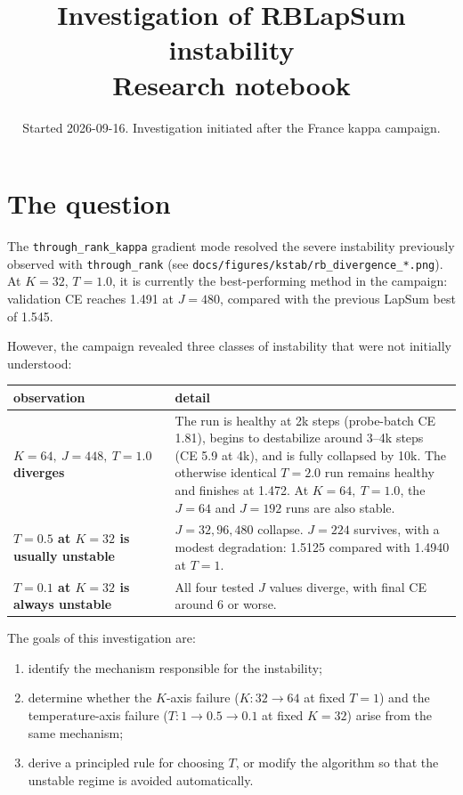 \documentclass[11pt,a4paper]{article}
\title{
Investigation of RBLapSum \code{through\_rank\_kappa} instability\\[2pt]
\large Research notebook
}
\author{}
\date{Started 2026-09-16. Investigation initiated after the France kappa campaign.}
\newcommand{\code}[1]{\texttt{#1}}
\begin{document}
\maketitle
\vspace{-2em}
\tableofcontents


\section{The question}

The \code{through\_rank\_kappa} gradient mode resolved the severe instability
previously observed with \code{through\_rank}
(see \code{docs/figures/kstab/rb\_divergence\_*.png}).
At \(K=32\), \(T=1.0\), it is currently the best-performing method in the
campaign: validation CE reaches 1.491 at \(J=480\), compared with the previous
LapSum best of 1.545.

However, the campaign revealed three classes of instability that were not
initially understood:

\begin{center}\small
\begin{tabular}{p{4.2cm}p{9.6cm}}
\toprule
observation & detail \\
\midrule

\textbf{\(K=64,\ J=448,\ T=1.0\) diverges}
&
The run is healthy at 2k steps (probe-batch CE 1.81), begins to destabilize
around 3--4k steps (CE 5.9 at 4k), and is fully collapsed by 10k.
The otherwise identical \(T=2.0\) run remains healthy and finishes at 1.472.
At \(K=64,\ T=1.0\), the \(J=64\) and \(J=192\) runs are also stable.
\\[2pt]

\textbf{\(T=0.5\) at \(K=32\) is usually unstable}
&
\(J=32,96,480\) collapse. \(J=224\) survives, with a modest degradation:
1.5125 compared with 1.4940 at \(T=1\).
\\[2pt]

\textbf{\(T=0.1\) at \(K=32\) is always unstable}
&
All four tested \(J\) values diverge, with final CE around 6 or worse.
\\

\bottomrule
\end{tabular}
\end{center}

The goals of this investigation are:

\begin{enumerate}[leftmargin=1.6em]
    \item identify the mechanism responsible for the instability;
    \item determine whether the \(K\)-axis failure
    (\(K:32\to64\) at fixed \(T=1\))
    and the temperature-axis failure
    (\(T:1\to0.5\to0.1\) at fixed \(K=32\))
    arise from the same mechanism;
    \item derive a principled rule for choosing \(T\), or modify the algorithm
    so that the unstable regime is avoided automatically.
\end{enumerate}
\end{document}
